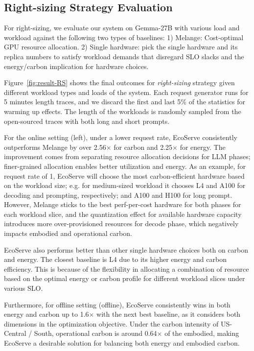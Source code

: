 \subsection{Right-sizing Strategy Evaluation}
For right-sizing, we evaluate our system on Gemma-27B with various load and workload against the following two types of baselines: 1) Melange: Cost-optimal GPU resource allocation. 2) Single hardware: pick the single hardware and its replica numbers to satisfy workload demands that disregard SLO slacks and the energy/carbon implication for hardware choices. 

Figure~\ref{fig:result-RS} shows the final outcomes for \textit{right-sizing} strategy given different workload types and loads of the system. Each request generator runs for 5 minutes length traces, and we discard the first and last 5\% of the statistics for warming up effects. The length of the workloads is randomly sampled from the open-sourced traces with both long and short prompts.  %

For the online setting (left), under a lower request rate, EcoServe consistently outperforms Melange by over 2.56$\times$  for carbon and 2.25$\times$  for energy. 
The improvement comes from separating resource allocation decisions for LLM phases; finer-grained allocation enables better utilization and energy. As an example, for request rate of 1, EcoServe will choose the most carbon-efficient hardware based on the workload size; e.g. for medium-sized workload it chooses L4 and A100 for decoding and prompting, respectively; and A100 and H100 for long prompt. 
However, Melange sticks to the best perf-per-cost hardware for both phases for each workload slice, and the quantization effect for available hardware capacity introduces more over-provisioned resources for decode phase, which negatively impacts embodied and operational carbon.

EcoServe also performs better than other single hardware choices both on carbon and energy. The closest baseline is L4 due to its higher energy and carbon efficiency. This is because of the flexibility in allocating a combination of resource based on the optimal energy or carbon profile for different workload slices under various SLO. 

Furthermore, for offline setting (offline), EcoServe consistently wins in both energy and carbon up to 1.6$\times$ with the next best baseline, as it considers both dimensions in the optimization objective.
Under the carbon intensity of US-Central / South, operational carbon is around 0.64$\times$ of the embodied, making EcoServe a desirable solution for balancing both energy and embodied carbon. 


